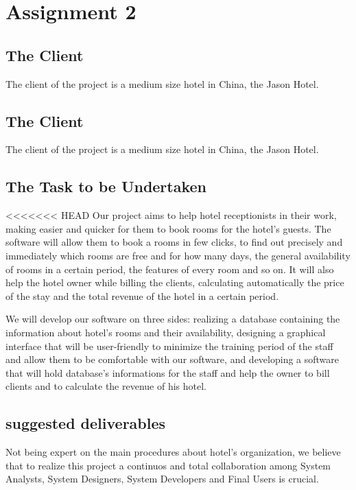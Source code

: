 
\section{Assignment 2}

\subsection{The Client}
The client of the project is a medium size hotel in China, the Jason Hotel.

\subsection{The Client}
The client of the project is a medium size hotel in China, the Jason Hotel.

\subsection{The Task to be Undertaken}
<<<<<<< HEAD
Our project aims to help hotel receptionists in their work, making easier and quicker for them to book rooms for the hotel's guests. The software will allow them to book a rooms in few clicks, to find out precisely and immediately which rooms are free and for how many days, the general availability of rooms in a certain period, the features of every room and so on. It will also help the hotel owner while billing the clients, calculating automatically the price of the stay and the total revenue of the hotel in a certain period.

We will develop our software on three sides: realizing a database containing the information about hotel's rooms and their availability, designing a graphical interface that will be user-friendly to minimize the training period of the staff and allow them to be comfortable with our software, and developing a software that will hold database's informations for the staff and help the owner to bill clients and to calculate the revenue of his hotel.




\subsection{suggested deliverables}
Not being expert on the main procedures about hotel’s organization, we believe that to realize this project a continuos and total collaboration among System Analysts, System Designers, System Developers and Final Users is crucial.


